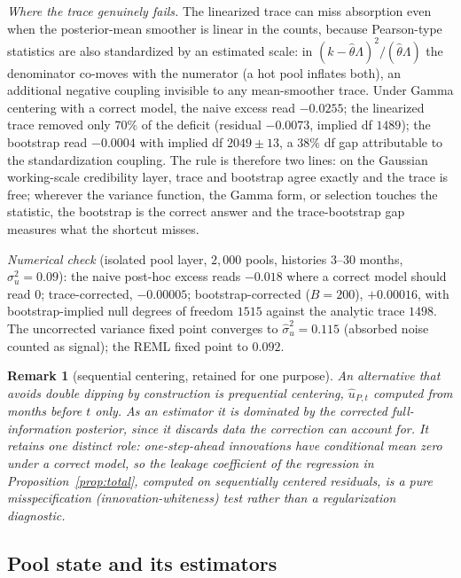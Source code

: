 \documentclass[11pt]{article}
\newtheorem{remark}[proposition]{Remark}
\begin{document}
\emph{Where the trace genuinely fails.} The linearized trace can miss absorption even
when the posterior-mean smoother is linear in the counts, because Pearson-type
statistics are also standardized by an estimated scale: in $(k-\hat\theta\Lambda)^2/
(\hat\theta\Lambda)$ the denominator co-moves with the numerator (a hot pool inflates
both), an additional negative coupling invisible to any mean-smoother trace. Under
Gamma centering with a correct model, the naive excess read $-0.0255$; the linearized
trace removed only $70\%$ of the deficit (residual $-0.0073$, implied df $1489$);
the bootstrap read $-0.0004$ with implied df $2049\pm13$, a $38\%$ df gap
attributable to the standardization coupling. The rule is therefore two lines: on the
Gaussian working-scale credibility layer, trace and bootstrap agree exactly and the
trace is free; wherever the variance function, the Gamma form, or selection touches
the statistic, the bootstrap is the correct answer and the trace-bootstrap gap
measures what the shortcut misses.

\emph{Numerical check} (isolated pool layer, $2{,}000$ pools, histories $3$--$30$
months, $\sigma_u^2=0.09$): the naive post-hoc excess reads $-0.018$ where a correct
model should read $0$; trace-corrected, $-0.00005$; bootstrap-corrected
($B=200$), $+0.00016$, with bootstrap-implied null degrees of freedom $1515$ against
the analytic trace $1498$. The uncorrected variance fixed point converges to
$\hat\sigma_u^2=0.115$ (absorbed noise counted as signal); the REML fixed point to
$0.092$.

\begin{remark}[sequential centering, retained for one purpose]
An alternative that avoids double dipping by construction is prequential centering,
$\hat u_{P,t}$ computed from months before $t$ only. As an \emph{estimator} it is
dominated by the corrected full-information posterior, since it discards data the
correction can account for. It retains one distinct role: one-step-ahead innovations
have conditional mean zero under a correct model, so the leakage coefficient of the
regression in Proposition~\ref{prop:total}, computed on sequentially centered
residuals, is a pure misspecification (innovation-whiteness) test rather than a
regularization diagnostic.
\end{remark}

\subsection{Pool state and its estimators}\label{sec:poolstate}
\end{document}
